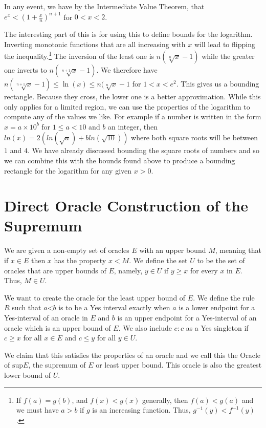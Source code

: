 \documentclass[12pt]{article}
\theoremstyle{remark}
\newcommand{\lt}{\mathord{<}}
\begin{document}
In any event, we have by the Intermediate Value Theorem, that $e^x < (1+\frac{x}{n})^{n+1}$ for $0 < x< 2$. 

The interesting part of this is for using this to define bounds for the logarithm. Inverting monotonic functions that are all increasing with $x$ will lead to flipping the inequality.\footnote{If $f(a)=g(b)$, and $f(x) < g(x)$ generally, then $f(a) < g(a)$ and we must have $a > b$ if $g$ is an increasing function. Thus, $g^{-1} (y) < f^{-1} (y)$.}  The inversion of the least one is $n(\sqrt[n]{ x }- 1)$ while the greater one inverts to $n(\sqrt[n+1]{x} - 1)$. We therefore have $n(\sqrt[n+1]{x} - 1) \leq \ln(x) \leq n (\sqrt[n]{x}-1$ for $1 < x < e^2$. This gives us a bounding rectangle. Because they cross, the lower one is a better approximation.  While this only applies for a limited region, we can use the properties of the logarithm to compute any of the values we like. For example if a number is written in the form $x=a\times 10^b$ for $1 \leq a < 10$ and $b$ an integer, then $ln(x) = 2 ( ln( \sqrt{a} ) + b ln(\sqrt{10}) )$ where both square roots will be between $1$ and $4$. We have already discussed bounding the square roots of numbers and so we can combine this with the bounds found above to produce a bounding rectangle for the logarithm for any given $x>0$. 

\section{Direct Oracle Construction of the Supremum}\label{app:sup}

We are given a non-empty set of oracles $E$ with an upper bound $M$, meaning that if $x \in E$ then $x$ has the property $x < M$. We define the set $U$ to be the set of oracles that are upper bounds of $E$, namely, $y \in U$ if $y \geq x$ for every $x$ in $E$.  Thus, $M \in U$.

We want to create the oracle for the least upper bound of $E$. We define the rule $R$ such that $a\lt b$ is to be a Yes interval exactly when $a$ is a lower endpoint for a Yes-interval of an oracle in $E$ and $b$ is an upper endpoint for a Yes-interval of an oracle which is an upper bound of $E$. We also include $c:c$ as a Yes singleton if $c \geq x$ for all $x \in E$ and $c \leq y$ for all $y\in U$.

We claim that this satisfies the properties of an oracle and we call this the Oracle of $\mathrm{sup} E$, the supremum of $E$ or least upper bound. This oracle is also the greatest lower bound of $U$.
\end{document}
